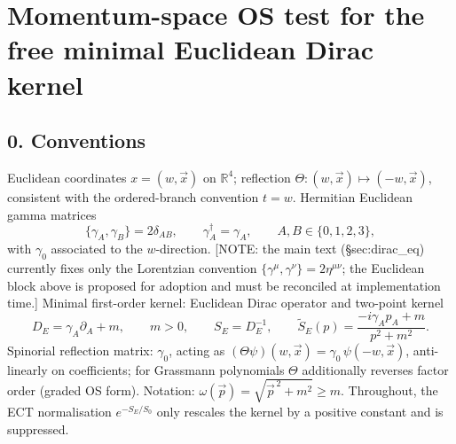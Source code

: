 
\section*{Momentum-space OS test for the free minimal Euclidean
Dirac kernel}

\subsection*{0. Conventions}
Euclidean coordinates $x=(w,\vec x)$ on $\mathbb R^4$; reflection
$\Theta:(w,\vec x)\mapsto(-w,\vec x)$, consistent with the
ordered-branch convention $t=w$.
Hermitian Euclidean gamma matrices
\[
\{\gamma_A,\gamma_B\}=2\delta_{AB},\qquad
\gamma_A^{\dagger}=\gamma_A,\qquad A,B\in\{0,1,2,3\},
\]
with $\gamma_0$ associated to the $w$-direction.
[NOTE: the main text (\S sec:dirac\_eq) currently fixes only the
Lorentzian convention $\{\gamma^\mu,\gamma^\nu\}=2\eta^{\mu\nu}$;
the Euclidean block above is proposed for adoption and must be
reconciled at implementation time.]
Minimal first-order kernel: Euclidean Dirac operator and two-point
kernel
\[
D_E=\gamma_A\partial_A+m,\qquad m>0,\qquad
S_E=D_E^{-1},\qquad
\tilde S_E(p)=\frac{-i\gamma_A p_A+m}{p^2+m^2}.
\]
Spinorial reflection matrix: $\gamma_0$, acting as
$(\Theta\psi)(w,\vec x)=\gamma_0\,\psi(-w,\vec x)$, anti-linearly
on coefficients; for Grassmann polynomials $\Theta$ additionally
reverses factor order (graded OS form).
Notation: $\omega(\vec p)=\sqrt{\vec p^{\,2}+m^2}\ge m$.
Throughout, the ECT normalisation $e^{-S_E/S_0}$ only rescales the
kernel by a positive constant and is suppressed.

